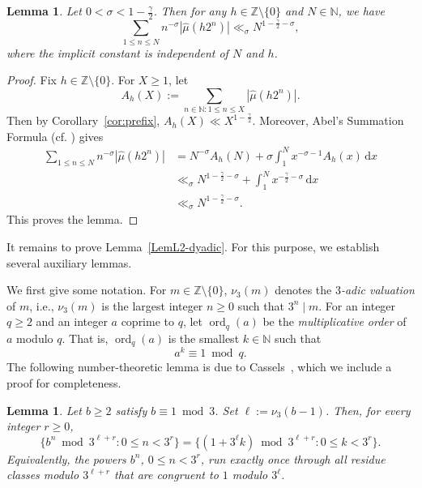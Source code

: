 \documentclass[amssymb,amsfonts,refcheck,12pt,verbatim,righttag]{amsart}
\numberwithin{equation}{section} %
\DeclareMathOperator{\ord}{ord}
\newtheorem{lem}[thm]{Lemma}
\newcommand{\N}{\mathbb{N}}
\newcommand{\Z}{\mathbb{Z}}
\theoremstyle{plain}
\begin{document}
\begin{lem}\label{lem:weightedL1}
	Let  $0< \sigma<1-\frac{\gamma}{2}$.  Then for any $h\in\Z\setminus\{0\}$ and  $N\in\N$, we have
\begin{equation*}\label{eq:weighted-L1}
		\sum_{1\leq n\leq N}n^{- \sigma}|\widehat\mu(h2^n)|
		\ll_{\sigma} N^{1-\frac{\gamma}{2}-\sigma},
	\end{equation*}
	where the implicit constant is independent of $N$ and $h$. 
\end{lem}

\begin{proof}
Fix $h\in\Z\setminus\{0\}$. For $X\geq1$, let
\[A_h(X):=\sum_{n\in\N: 1\leq n\leq X}|\widehat\mu(h2^n)|.\]
Then by  Corollary~\ref{cor:prefix}, $A_h(X)\ll X^{1-\frac{\gamma}{2}}$. Moreover,  Abel’s Summation Formula (cf. \cite[Theorem 4.10]{Pongsriiam}) gives
\begin{align*}
		\sum_{1\leq n\leq N}n^{-\sigma}|\widehat\mu(h2^n)|
		&=N^{-\sigma}A_h(N)
		+\sigma\int_1^N x^{-\sigma-1}A_h(x)\, \mathrm{d}x \\
		&\ll_{\sigma} N^{1-\frac{\gamma}{2}-\sigma}
		+\int_1^N x^{-\frac{\gamma}{2}-\sigma}\, \mathrm{d}x\\
		&\ll_{\sigma} N^{1-\frac{\gamma}{2}-\sigma}.
\end{align*}
This proves the lemma.
\end{proof}

It remains to prove Lemma~\ref{LemL2-dyadic}.
For this purpose, we  establish several auxiliary lemmas. 

We first give some notation.  For $m\in\Z\setminus\{0\}$,  $\nu_3(m)$ denotes the {\it $3$-adic valuation} of $m$, i.e., $\nu_3(m)$ is the largest integer $n\geq 0$ such that $3^n\mid m$.  For an integer $q\geq 2$ and an integer $a$ coprime to $q$, let $\ord_q(a)$
be the {\it multiplicative order} of $a$ modulo $q$. That is, $\ord_{q}(a)$ is the smallest $k\in\N$ such that 
\[a^{k}\equiv 1\bmod q.\] The following number-theoretic lemma is due to Cassels~\cite[Lemma 2]{Cassels59}, which we include a proof for completeness.

\begin{lem}\label{lemmod3lr}
Let $b\ge 2$ satisfy $b\equiv 1\bmod{3}$. Set $\ell := \nu_3(b-1)$.
	Then, for every integer $r\ge 0$,
\begin{equation}\label{eqbn1to3r}
		\{b^n \bmod 3^{\ell+r}: 0\leq n<3^r\}
		=
		\{(1+3^{\ell}k)\bmod 3^{\ell+r}: 0\leq k<3^{r}\}.
	\end{equation}
	Equivalently, the powers $b^n$, $0\leq n<3^r$, run exactly once through all residue classes modulo $3^{\ell+r}$ that are congruent to $1$ modulo $3^\ell$.
\end{lem}
\end{document}
